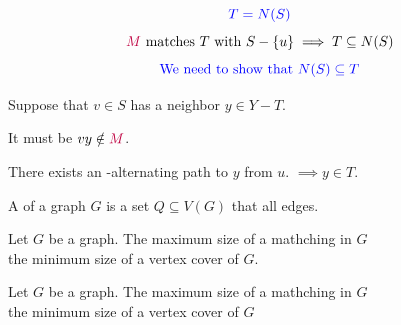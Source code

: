 \begin{frame}{}
  \vspace{-0.50cm}
  \begin{center}
    \[
      \textcolor{blue}{T = N(S)}
    \]
    \vspace{-0.80cm}
    \pause
    \[
      \text{\textcolor{purple}{$M$} matches $T$ with $S - \{u\}$} \implies T \subseteq N(S)
    \]
    \pause
    \vspace{-0.30cm}
    \[
      \textcolor{blue}{\text{We need to show that } N(S) \subseteq T}
    \]

    \pause
    \begin{center}
      Suppose  that $v \in S$ has a neighbor $y \in Y - T$.

      \pause
      \vspace{0.20cm}
      It must be $vy \notin \textcolor{purple}{M}$.

      \pause
      \vspace{0.20cm}
      There exists an -alternating path to $y$ from $u$.
      \pause
      $\implies y \in T$.
    \end{center}
  \end{center}
\end{frame}

\begin{frame}{}
  \begin{definitions}
    A  of a graph $G$ is a set $Q \subseteq V(G)$
    that  all edges.
  \end{definitions}

\end{frame}

\begin{frame}{}

  \pause
\end{frame}

\begin{frame}{}
  \begin{theorem}
    Let $G$ be a graph.
    The maximum size of a mathching in $G$ \\
    \red{$\le$} the minimum size of a vertex cover of $G$.
  \end{theorem}

  \pause

  \pause
  \begin{theorem}
    Let $G$ be a  graph.
    The maximum size of a mathching in $G$ \\
    \red{=} the minimum size of a vertex cover of $G$
  \end{theorem}
\end{frame}

